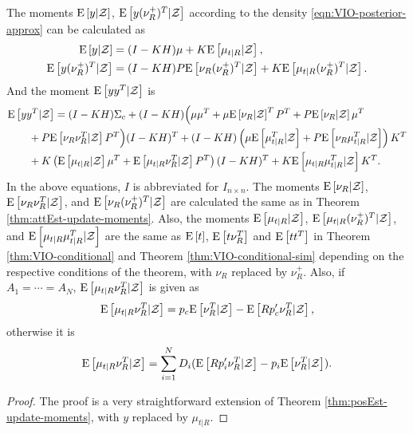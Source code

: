 \begin{theorem} \label{thm:VIO-posterior-conditional-moments}
	The moments $\mathrm{E}\left[ y|\mathcal{Z} \right]$, $\mathrm{E}\left[ y(\nu_R^+)^T|\mathcal{Z} \right]$ according to the density \eqref{eqn:VIO-posterior-approx} can be calculated as
	\begin{align}
		\mathrm{E}\left[ y|\mathcal{Z} \right] &= (I-KH)\mu + K\mathrm{E}\left[ \mu_{t|R}|\mathcal{Z} \right], \\
		\mathrm{E}\left[ y(\nu_R^+)^T|\mathcal{Z} \right] &= (I-KH)P\mathrm{E}\left[ \nu_R(\nu_R^+)^T|\mathcal{Z} \right] + K\mathrm{E}\left[ \mu_{t|R}(\nu_R^+)^T|\mathcal{Z} \right].
	\end{align}
	And the moment $\mathrm{E}\left[ yy^T|\mathcal{Z} \right]$ is
	\begin{align}
		&\mathrm{E}\left[ yy^T|\mathcal{Z} \right] = (I-KH)\Sigma_c + (I-KH) \Big( \mu\mu^T + \mu\mathrm{E}\left[ \nu_R|\mathcal{Z} \right]^TP^T + P\mathrm{E}\left[ \nu_R|\mathcal{Z} \right]\mu^T \nonumber \\
		&\qquad + P\mathrm{E}\left[ \nu_R\nu_R^T|\mathcal{Z} \right]P^T \Big) (I-KH)^T + (I-KH)\left( \mu\mathrm{E}\left[ \mu_{t|R}^T|\mathcal{Z} \right] + P\mathrm{E}\left[ \nu_R\mu_{t|R}^T|\mathcal{Z} \right] \right)K^T \nonumber \\
		&\qquad + K\left(\mathrm{E}\left[ \mu_{t|R}|\mathcal{Z} \right]\mu^T + \mathrm{E}\left[ \mu_{t|R}\nu_R^T|\mathcal{Z} \right]P^T\right)(I-KH)^T + K\mathrm{E}\left[ \mu_{t|R}\mu_{t|R}^T|\mathcal{Z} \right]K^T.
	\end{align}
	In the above equations, $I$ is abbreviated for $I_{n\times n}$.
	The moments $\mathrm{E}\left[ \nu_R|\mathcal{Z} \right]$, $\mathrm{E}\left[ \nu_R\nu_R^T|\mathcal{Z} \right]$, and $\mathrm{E}\left[ \nu_R(\nu_R^+)^T|\mathcal{Z} \right]$ are calculated the same as in Theorem \ref{thm:attEst-update-moments}.
	Also, the moments $\mathrm{E}\left[ \mu_{t|R}|\mathcal{Z} \right]$, $\mathrm{E}\left[ \mu_{t|R}(\nu_R^+)^T|\mathcal{Z} \right]$, and $\mathrm{E}\left[ \mu_{t|R}\mu_{t|R}^T|\mathcal{Z} \right]$ are the same as $\mathrm{E}\left[ t \right]$, $\mathrm{E}\left[ t\nu_R^T \right]$ and $\mathrm{E}\left[ tt^T \right]$ in Theorem \ref{thm:VIO-conditional} and Theorem \ref{thm:VIO-conditional-sim} depending on the respective conditions of the theorem, with $\nu_R$ replaced by $\nu_R^+$.
	Also, if $A_1 = \cdots = A_N$, $\mathrm{E}\left[ \mu_{t|R}\nu_R^T|\mathcal{Z} \right]$ is given as
	\begin{align}
		\mathrm{E}\left[ \mu_{t|R}\nu_R^T|\mathcal{Z} \right] = p_c\mathrm{E}\left[ \nu_R^T|\mathcal{Z} \right] - \mathrm{E}\left[ Rp'_c\nu_R^T|\mathcal{Z} \right],
	\end{align}
	otherwise it is
	\begin{align}
		\mathrm{E}\left[ \mu_{t|R}\nu_R^T|\mathcal{Z} \right] = \sum_{i=1}^N D_i(\mathrm{E}\left[ Rp'_i\nu_R^T|\mathcal{Z} \right] - p_i\mathrm{E}\left[ \nu_R^T|\mathcal{Z} \right]).
	\end{align}
\end{theorem}
\begin{proof}
	The proof is a very straightforward extension of Theorem \ref{thm:posEst-update-moments}, with $y$ replaced by $\mu_{t|R}$.
\end{proof}

